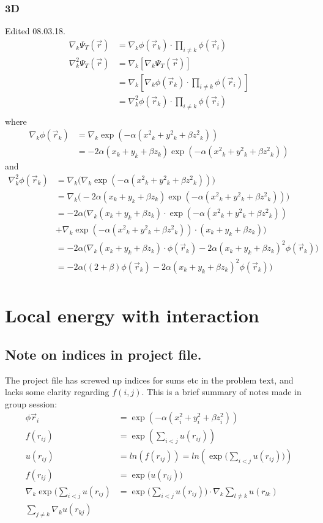 \documentclass[12pt]{article}
\begin{document}
\subsubsection{3D}
Edited 08.03.18.
\begin{align*}
	\nabla_k\Psi_T(\vec{r}) &= \nabla_k\phi(\vec{r}_k)\cdot\prod_{i \neq k}\phi(\vec{r}_i) \\
	\nabla^{2}_{k}\Psi_T(\vec{r}) &=\nabla_k[\nabla_k\Psi_T(\vec{r})] \\
	&= \nabla_k[\nabla_k\phi(\vec{r}_k)\cdot\prod_{i \neq k}\phi(\vec{r}_i)] \\
	&= \nabla^{2}_{k}\phi(\vec{r}_k)\cdot\prod_{i \neq k}\phi(\vec{r}_i)\\
\end{align*}
where
\begin{align*}
	\nabla_k\phi(\vec{r}_k) &= \nabla_k\exp(-\alpha(x{^2}_k+y{^2}_k+\beta z{^2}_k)) \\
	&= -2\alpha(x_k + y_k + \beta z_k)\exp(-\alpha(x{^2}_k+y{^2}_k+\beta z{^2}_k))
\end{align*}
and
\begin{align*}
	\nabla^{2}_{k}\phi(\vec{r}_k) &= \nabla_k\big(\nabla_k
		\exp(-\alpha(x{^2}_k+y{^2}_k+\beta z{^2}_k))\big) \\
	&= \nabla_k\big(-2\alpha(x_k + y_k + \beta z_k)
		\exp(-\alpha(x{^2}_k+y{^2}_k+\beta z{^2}_k))\big) \\
	&= -2\alpha\big(\nabla_k(x_k + y_k + \beta z_k)
		\cdot\exp(-\alpha(x{^2}_k+y{^2}_k+\beta z{^2}_k)) \\
		&+ \nabla_k\exp(-\alpha(x{^2}_k+y{^2}_k+\beta z{^2}_k))
		\cdot(x_k + y_k + \beta z_k)\big) \\
	&= -2\alpha\big(\nabla_k(x_k + y_k + \beta z_k)\cdot\phi(\vec{r}_k)
		-2\alpha(x_k + y_k + \beta z_k)^2\phi(\vec{r}_k)\big) \\
	&= -2\alpha\big((2+\beta)\phi(\vec{r}_k)
		-2\alpha(x_k + y_k + \beta z_k)^2\phi(\vec{r}_k)\big) \\
\end{align*}

\section{Local energy with interaction}
\subsection{Note on indices in project file.}
The project file has screwed up indices for sums etc in the problem text,
and lacks some clarity regarding $f(i,j)$. This is a brief summary of notes made
in group session:
\begin{align*}
	\phi{\vec{r}_i} &= \exp(-\alpha(x^{2}_i + y^{2}_i + \beta z^{2}_i))\\
	f(r_{ij}) &= \exp(\sum_{i<j}u(r_{ij})) \\
	u(r_{ij}) &= ln(f(r_{ij})) = ln(\exp\big(\sum_{i<j}u(r_{ij})\big)) \\
	f(r_{ij}) &= \exp\big(u(r_{ij})\big) \\
	\nabla_k \exp\big(\sum_{i<j} u(r_{ij}) &= \exp\big(\sum_{i<j} u(r_{ij})\big) \cdot 
	\nabla_k \sum_{l\neq k} u(r_{lk}) \\
	\sum_{j\neq k} \nabla_k u(r_{kj})
\end{align*}
\end{document}
